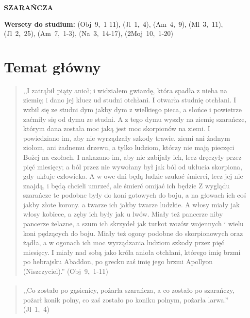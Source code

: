 \documentclass[10pt,a4paper,oneside]{article}
\begin{document}
\centerline{\textbf{\MakeUppercase{Szarańcza}}}
\begin{center}
\textbf{Wersety do studium:} 
\mbox{(Obj 9, 1-11)}, \mbox{(Jl 1, 4)}, \mbox{(Am 4, 9)}, \mbox{(Ml 3, 11)}, \mbox{(Jl 2, 25)}, \mbox{(Am 7, 1-3)}, \mbox{(Na 3, 14-17)}, \mbox{(2Moj 10, 1-20)}
\end{center}
\section{Temat główny}
\paragraph{}
\begin{quote}
,,I zatrąbił piąty anioł; i widziałem gwiazdę, która spadła z nieba na ziemię; i dano jej klucz ud studni otchłani. I otwarła studnię otchłani. I wzbił się ze studni dym jakby dym z wielkiego pieca, a słońce i powietrze zaćmiły się od dymu ze studni. A z tego dymu wyszły na ziemię szarańcze, którym dana została moc jaką jest moc skorpionów na ziemi. I powiedziano im, aby nie wyrządzały szkody trawie, ziemi ani żadnym ziołom, ani żadnemu drzewu, a tylko ludziom, którzy nie mają pieczęci Bożej na czołach. I nakazano im, aby nie zabijały ich, lecz dręczyły przez pięć miesięcy; a ból przez nie wywołany był jak ból od ukłucia skorpiona, gdy ukłuje człowieka. A w owe dni będą ludzie szukać śmierci, lecz jej nie znajdą, i będą chcieli umrzeć, ale śmierć omijać ich będzie Z wyglądu szarańcze te podobne były do koni gotowych do boju, a na głowach ich coś jakby złote korony. a twarze ich jakby twarze ludzkie. A włosy miały jak włosy kobiece, a zęby ich były jak u lwów. Miały też pancerze niby pancerze żelazne, a szum ich skrzydeł jak turkot wozów wojennych i wielu koni pędzących do boju. Miały też ogony podobne do skorpionowych oraz żądła, a w ogonach ich moc wyrządzania ludziom szkody przez pięć miesięcy. I miały nad sobą jako króla anioła otchłani, którego imię brzmi po hebrajsku Abaddon, po grecku zaś imię jego brzmi Apollyon (Niszczyciel).'' \mbox{(Obj 9, 1-11)}
\end{quote}
\paragraph{}
\begin{quote}
,,Co zostało po gąsienicy, pożarła szarańcza, a co zostało po szarańczy, pożarł konik polny, co zaś zostało po koniku polnym, pożarła larwa.'' \mbox{(Jl 1, 4)}
\end{quote}
\end{document}
